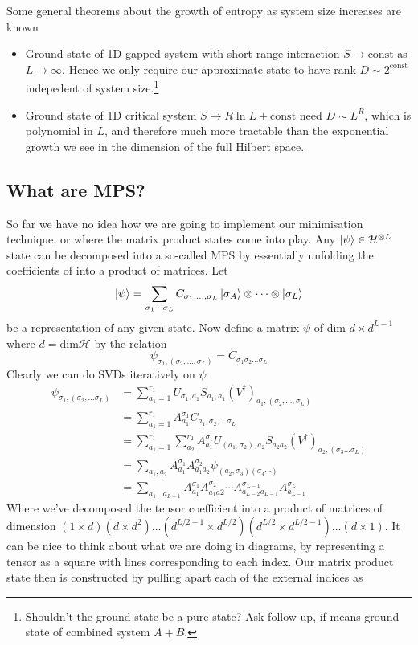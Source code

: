 \documentclass[a4paper]{article}
\begin{document}
\begin{remark}
Some general theorems about the growth of entropy as system size increases are
known
\begin{itemize}
    \item  Ground state of 1D gapped system with short range interaction $S\to
    \mathrm{const}$ as $L\to \infty$. Hence we only require our approximate
    state to have rank $D\sim 2^\mathrm{const}$ indepedent of system size.\footnote{Shouldn't the
    ground state be a pure state? Ask follow up, if means ground state of
combined system $A+B$.}
    \item  Ground state of 1D critical system $S\to R \ln L+\mathrm{const}$ need $D\sim
        L^R$, which is polynomial in $L$, and therefore much more tractable than
        the exponential growth we see in the dimension of the full Hilbert
        space. 
\end{itemize}
\end{remark}
\subsection{What are MPS?}
So far we have no idea how we are going to implement our minimisation technique,
or where the matrix product states come into play. Any $\ket{\psi}\in
\mathcal{H}^{\otimes
L}$ state can be
decomposed into a so-called MPS by essentially unfolding the coefficients of
into a product of matrices. Let 
\[
\ket{\psi}=\sum_{\sigma_1\cdots\sigma_L} C_{\sigma_1,\dots,\sigma_L}\ket{\sigma_A}\otimes\cdots\otimes\ket{\sigma_L}
\]
be a representation of any given state. Now define a matrix $\psi$ of dim $d\times
d^{L-1}$ where $d=\mathrm{dim}\mathcal{H}$ by the relation
\[\psi_{\sigma_1,(\sigma_2,\dots,\sigma_L)}=C_{\sigma_1\sigma_2\dots\sigma_L}\]
Clearly we can do SVDs iteratively on $\psi$
\begin{align*}
    \psi_{\sigma_1,(\sigma_2,\dots\sigma_L)}&=\sum_{a_1=1}^{r_1} U_{\sigma_1,a_1}
S_{a_1,a_1} (V^\dagger)_{a_1,(\sigma_2,\dots,\sigma_L)}\\
&=\sum_{a_1=1}^{r_1} A^{\sigma_1}_{a_1} C_{a_1,\sigma_2,\dots \sigma_L}\\
&=\sum_{a_1=1}^{r_1}\sum_{a_2}^{r_2} A_{a_1}^{\sigma_1}
U_{(a_1,\sigma_2),a_2} S_{a_2a_2}
(V^{\dagger})_{a_2,(\sigma_3\dots\sigma_L)}\\
&=\sum_{a_1,a_2}
A_{a_1}^{\sigma_1}A_{a_1a_2}^{\sigma_2}\psi_{(a_2,\sigma_3)(\sigma_4\cdots)}\\
&=\sum_{a_1\dots a_{L-1}} A^{\sigma_1}_{a_1} A^{\sigma_2}_{a_1a2}\cdots
A_{a_{L-2}a_{L-1}}^{\sigma_{L-1}} A_{a_{L-1}}^{\sigma_L}
\end{align*}
Where we've decomposed the tensor coefficient into a product of matrices of
dimension  $(1\times d)(d\times d^2)\dots (d^{L/2-1} \times d^{L/2})( d^{L/2}
\times d^{L/2 -1})\dots(d\times 1)$. It can be nice to think about what we are
doing in diagrams, by representing a tensor as a square with lines corresponding
to each index. Our matrix product state then is constructed by pulling apart
each of the external indices as
\end{document}

